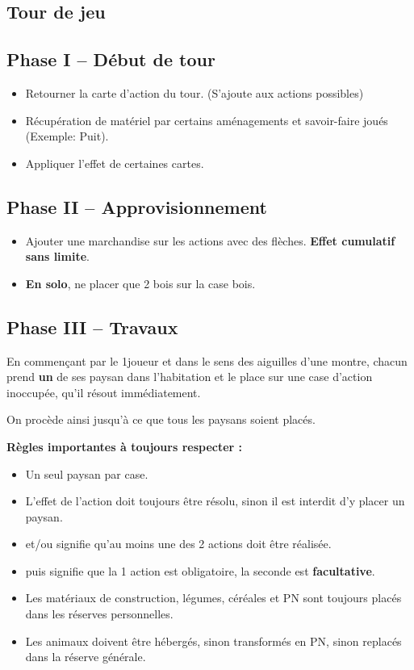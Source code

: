 \documentclass[10pt, a4paper]{article}	%
\begin{document}
\begin{multicols}{3}
\section{Tour de jeu}

\subsection{Phase I -- Début de tour}
\begin{itemize}
\item Retourner la carte d'action du tour. (S'ajoute aux actions possibles)
\item Récupération de matériel par certains aménagements et savoir-faire joués (Exemple: Puit).
\item Appliquer l'effet de certaines cartes.
\end{itemize}



\subsection{Phase II -- Approvisionnement}
\begin{itemize}
\item Ajouter une marchandise sur les actions avec des flèches. \textbf{Effet cumulatif sans limite}.
\item \textbf{En solo}, ne placer que 2 bois sur la case  bois\fg{}.
\end{itemize}


\subsection{Phase III -- Travaux}
En commençant par le 1\ier joueur et dans le sens des aiguilles d'une montre, chacun prend \textbf{un} de ses  paysan dans l'habitation et le place sur une case d'action inoccupée, qu'il résout immédiatement.

On procède ainsi jusqu'à ce que tous les paysans soient placés.

\textbf{Règles importantes à toujours respecter :}
\begin{itemize}
\item Un seul paysan par case.
\item L'effet de l'action doit toujours être résolu, sinon il est interdit d'y placer un paysan.
\item \og et/ou\fg{} signifie qu'au moins une des 2 actions doit être réalisée.
\item \og puis\fg{} signifie que la 1\iere{} action est obligatoire, la seconde est \textbf{facultative}.
\item Les matériaux de construction, légumes, céréales et PN sont toujours placés dans les réserves personnelles.
\item Les animaux doivent être hébergés, sinon transformés en PN, sinon replacés dans la réserve générale.
\end{itemize}



\end{multicols}
\end{document}
